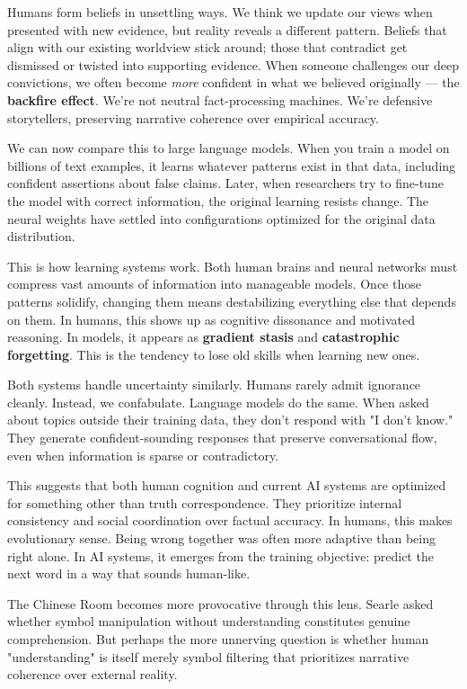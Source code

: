\begin{commentary}
Humans form beliefs in unsettling ways. We think we update our views when presented with new evidence, but reality reveals a different pattern. Beliefs that align with our existing worldview stick around; those that contradict get dismissed or twisted into supporting evidence. When someone challenges our deep convictions, we often become \textit{more} confident in what we believed originally — the \textbf{backfire effect}. We're not neutral fact-processing machines. We're defensive storytellers, preserving narrative coherence over empirical accuracy.

We can now compare this to large language models. When you train a model on billions of text examples, it learns whatever patterns exist in that data, including confident assertions about false claims. Later, when researchers try to fine-tune the model with correct information, the original learning resists change. The neural weights have settled into configurations optimized for the original data distribution.

This is how learning systems work. Both human brains and neural networks must compress vast amounts of information into manageable models. Once those patterns solidify, changing them means destabilizing everything else that depends on them. In humans, this shows up as cognitive dissonance and motivated reasoning. In models, it appears as \textbf{gradient stasis} and \textbf{catastrophic forgetting}. This is the tendency to lose old skills when learning new ones.

Both systems handle uncertainty similarly. Humans rarely admit ignorance cleanly. Instead, we confabulate. Language models do the same. When asked about topics outside their training data, they don't respond with "I don't know." They generate confident-sounding responses that preserve conversational flow, even when information is sparse or contradictory.

This suggests that both human cognition and current AI systems are optimized for something other than truth correspondence. They prioritize internal consistency and social coordination over factual accuracy. In humans, this makes evolutionary sense. Being wrong together was often more adaptive than being right alone. In AI systems, it emerges from the training objective: predict the next word in a way that sounds human-like.

The Chinese Room becomes more provocative through this lens. Searle asked whether symbol manipulation without understanding constitutes genuine comprehension. But perhaps the more unnerving question is whether human "understanding" is itself merely symbol filtering that prioritizes narrative coherence over external reality.
\end{commentary}